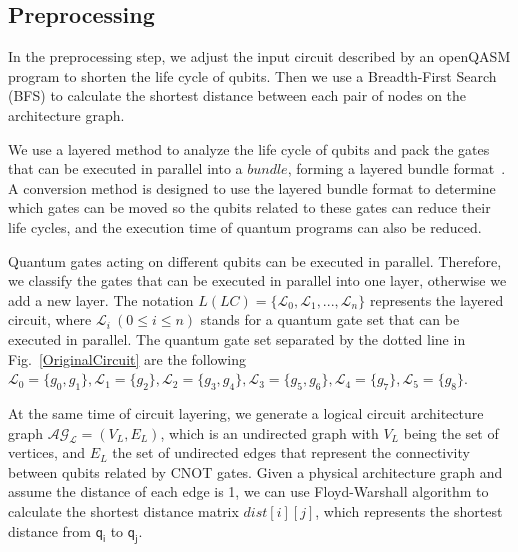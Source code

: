 \documentclass[journal]{IEEEtran}
\begin{document}
\subsection{Preprocessing}
In the preprocessing step, we adjust the input circuit described by an openQASM program to shorten the life cycle of qubits. Then we use a Breadth-First Search (BFS) to calculate the shortest distance between each pair of nodes on the architecture graph.

We use a layered method to analyze the life cycle of qubits and pack the gates that can be executed in parallel into a $bundle$, forming a layered bundle format~\cite{2019Zhang}.
A conversion method is designed to use the layered bundle format to determine which gates can be moved so the qubits related to these gates can reduce their life cycles, and the execution time of quantum programs can also be reduced. %

Quantum gates acting on different qubits can be executed in parallel. Therefore, we classify the gates that can be executed in parallel into one layer, otherwise we add a new layer. The notation $L(LC)=\{\mathcal{L}_{0},\mathcal{L}_{1},...,\mathcal{L}_{n}\}$ represents the layered circuit, where $\mathcal{L}_{i} \ (0 \le i \le n) $ stands for a quantum gate set that can be executed in parallel. The quantum gate set separated by the dotted line in Fig.~\ref{OriginalCircuit} are the following $\mathcal{L}_{0}=\{g_{0},g_{1}\},\mathcal{L}_{1}=\{g_{2}\},
\mathcal{L}_{2}=\{g_{3},g_{4}\},\mathcal{L}_{3}=\{g_{5},g_{6}\},\mathcal{L}_{4}=\{g_{7}\},\mathcal{L}_{5}=\{g_{8}\}$.

At the same time of circuit layering, we generate a logical circuit architecture graph $\mathcal{AG_{L}}=(V_{L},E_{L})$, which is an undirected graph with $V_{L}$ being the set of vertices, and $E_{L}$  the set of undirected edges that represent the connectivity between qubits related by CNOT gates.
Given a physical architecture graph and assume the distance of each edge is 1, we can use Floyd-Warshall algorithm to calculate the shortest distance matrix $dist[i][j]$, which represents the shortest distance from $\textsf{q}_{\textsf{i}}$ to $\textsf{q}_{\textsf{j}}$. 
\end{document}
